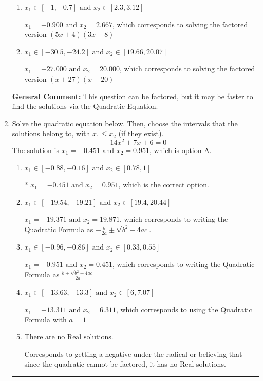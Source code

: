 \documentclass{extbook}[14pt]
\newcommand{\litem}[1]{\item #1

\rule{\textwidth}{0.4pt}}
\begin{document}
\begin{enumerate}
{\begin{enumerate}[label=\Alph*.]
$x_1 = -9.000 \text{ and } x_2 = 0.267$, which corresponds to solving the factored version $(x + 9)(15x -4)$
\item \( x_1 \in [-1, -0.7] \text{ and } x_2 \in [2.3, 3.12] \)

$x_1 = -0.900 \text{ and } x_2 = 2.667$, which corresponds to solving the factored version $(5x + 4)(3x -8)$
\item \( x_1 \in [-30.5, -24.2] \text{ and } x_2 \in [19.66, 20.07] \)

$x_1 = -27.000 \text{ and } x_2 = 20.000$, which corresponds to solving the factored version $(x + 27)(x -20)$
\end{enumerate}

\textbf{General Comment:} This question can be factored, but it may be faster to find the solutions via the Quadratic Equation.
}
\litem{
Solve the quadratic equation below. Then, choose the intervals that the solutions belong to, with $x_1 \leq x_2$ (if they exist).
\[ -14x^{2} +7 x + 6 = 0 \]The solution is \( x_1 = -0.451 \text{ and } x_2 = 0.951 \), which is option A.\begin{enumerate}[label=\Alph*.]
\item \( x_1 \in [-0.88, -0.16] \text{ and } x_2 \in [0.78, 1] \)

* $x_1 = -0.451 \text{ and } x_2 = 0.951$, which is the correct option.
\item \( x_1 \in [-19.54, -19.21] \text{ and } x_2 \in [19.4, 20.44] \)

 $x_1 = -19.371 \text{ and } x_2 = 19.871$, which corresponds to writing the Quadratic Formula as $-\frac{b}{2a} \pm \sqrt{b^2 - 4ac}$.
\item \( x_1 \in [-0.96, -0.86] \text{ and } x_2 \in [0.33, 0.55] \)

 $x_1 = -0.951 \text{ and } x_2 = 0.451$, which corresponds to writing the Quadratic Formula as $\frac{b \pm \sqrt{b^2 - 4ac}}{2a}$
\item \( x_1 \in [-13.63, -13.3] \text{ and } x_2 \in [6, 7.07] \)

 $x_1 = -13.311 \text{ and } x_2 = 6.311$, which corresponds to using the Quadratic Formula with $a=1$
\item \( \text{There are no Real solutions.} \)

Corresponds to getting a negative under the radical or believing that since the quadratic cannot be factored, it has no Real solutions.
\end{enumerate}

}
\end{enumerate}
\end{document}
